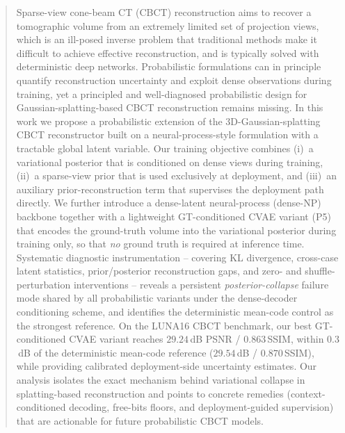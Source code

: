 
\begin{abstract}
Sparse-view cone-beam CT (CBCT) reconstruction aims to recover a tomographic
volume from an extremely limited set of projection views, which is an
ill-posed inverse problem that traditional methods make it difficult to 
achieve effective reconstruction, and is typically solved with deterministic
deep networks. Probabilistic formulations can in principle quantify
reconstruction uncertainty and exploit dense observations during training,
yet a principled and well-diagnosed probabilistic design for
Gaussian-splatting-based CBCT reconstruction remains missing. In this work
we propose a probabilistic extension of the 3D-Gaussian-splatting CBCT
reconstructor built on a neural-process-style formulation with a tractable
global latent variable. Our training objective combines
(i)~a variational posterior that is conditioned on dense views during
training, (ii)~a sparse-view prior that is used exclusively at deployment,
and (iii)~an auxiliary prior-reconstruction term that supervises the
deployment path directly. We further introduce a dense-latent
neural-process (dense-NP) backbone together with a lightweight
GT-conditioned CVAE variant (P5) that encodes the ground-truth volume into
the variational posterior during training only, so that \emph{no}
ground truth is required at inference time. Systematic diagnostic
instrumentation -- covering KL divergence, cross-case latent statistics,
prior/posterior reconstruction gaps, and zero- and shuffle-perturbation
interventions -- reveals a persistent \emph{posterior-collapse} failure
mode shared by all probabilistic variants under the dense-decoder
conditioning scheme, and identifies the deterministic mean-code control as
the strongest reference. On the LUNA16 CBCT benchmark, our best
GT-conditioned CVAE variant reaches $29.24$\,dB PSNR / $0.863$\,SSIM, within
$0.3$\,dB of the deterministic mean-code reference ($29.54$\,dB /
$0.870$\,SSIM), while providing calibrated deployment-side uncertainty
estimates. Our analysis isolates the exact mechanism behind variational
collapse in splatting-based reconstruction and points to concrete remedies
(context-conditioned decoding, free-bits floors, and deployment-guided
supervision) that are actionable for future probabilistic CBCT models.
\end{abstract}

